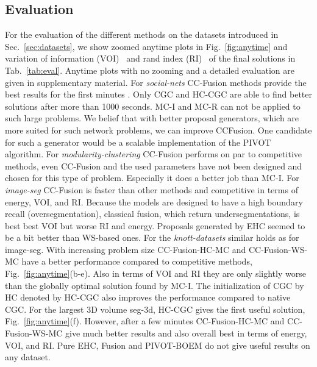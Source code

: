 \subsection{Evaluation}
For the evaluation of the different methods on the datasets introduced in Sec.~\ref{sec:datasets},
we show zoomed anytime plots in  Fig.~\ref{fig:anytime} and variation of information (VOI)~\cite{meila-2003}
and rand index (RI)~\cite{rand-1971} of the final solutions in Tab.~\ref{tab:eval}.
Anytime plots with no zooming and a detailed evaluation are given in supplementary material. 
%
For \emph{social-nets} CC-Fusion methods provide the best results for the first minutes .
Only CGC and HC-CGC are able to find better solutions after more than 1000 seconds.
MC-I and MC-R can not be applied to such large problems.
We belief that with better proposal generators, which are more suited for such network problems,
we can improve CCFusion. One candidate for such a generator would be a scalable implementation of the 
PIVOT algorithm.
%
For \emph{modularity-clustering} CC-Fusion performs on par to competitive methods, even CC-Fusion 
and the used parameters have not been designed and chosen for this type of problem.
Especially it does a better job than MC-I.
%
For \emph{image-seg} CC-Fusion is faster than other methods and competitive in terms of energy, VOI, and RI.
Because  the models are designed to have a high boundary recall (oversegmentation), 
classical fusion, which return undersegmentations, is best best VOI but worse RI and energy.
Proposals generated by EHC seemed to be a bit better than WS-based ones.
%
For the \emph{knott-datasets} similar holds as for image-seg. 
With increasing problem size CC-Fusion-HC-MC and CC-Fusion-WS-MC have a better performance compared to competitive methods, \cf Fig.~\ref{fig:anytime}(b-e).
Also in terms of VOI and RI they are only slightly worse than the globally optimal solution found by MC-I.
The initialization of CGC by HC denoted by HC-CGC also improves the performance compared to native CGC.
For the largest 3D volume seg-3d, HC-CGC gives the first useful solution, \cf  Fig.~\ref{fig:anytime}(f).
However, after a few minutes  CC-Fusion-HC-MC and CC-Fusion-WS-MC give much better results and also overall best in terms of energy, VOI, and RI.
%
Pure EHC, Fusion and PIVOT-BOEM do not give useful results on any dataset.
